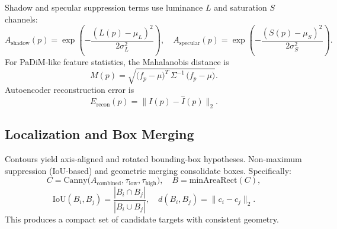 \documentclass[12pt]{article}
\begin{document}
\FloatBarrier
Shadow and specular suppression terms use luminance $L$ and saturation $S$ channels:
\[ A_{\mathrm{shadow}}(p)= \exp\!\left(-\frac{(L(p)-\mu_L)^2}{2\sigma_L^2}\right), \quad A_{\mathrm{specular}}(p)= \exp\!\left(-\frac{(S(p)-\mu_S)^2}{2\sigma_S^2}\right). \]
For PaDiM-like feature statistics, the Mahalanobis distance is
\[ M(p) = \sqrt{\big(f_p-\mu\big)^T\, \Sigma^{-1}\, \big(f_p-\mu\big)}. \]
Autoencoder reconstruction error is
\[ E_{\mathrm{recon}}(p)=\lVert I(p)-\hat I(p)\rVert_2. \]

\subsection{Localization and Box Merging}
Contours yield axis-aligned and rotated bounding-box hypotheses. Non-maximum suppression (IoU-based) and geometric merging consolidate boxes. Specifically:
\[ C = \mathrm{Canny}\big(A_{\mathrm{combined}}, \tau_{\mathrm{low}}, \tau_{\mathrm{high}}\big), \quad B=\mathrm{minAreaRect}(C), \]
\[ \mathrm{IoU}(B_i,B_j)=\frac{|B_i\cap B_j|}{|B_i\cup B_j|}, \quad d(B_i,B_j)=\lVert c_i-c_j\rVert_2. \]
This produces a compact set of candidate targets with consistent geometry.
\end{document}
